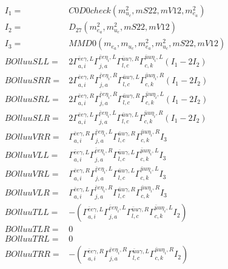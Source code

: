 \documentclass[A4,landscape]{article}
\begin{document}
\begin{align} 
I_1 = & C0D0check(m^2_{u_{{c}}}, mS22, mV12, m^2_{e_{{a}}}) \\ 
I_2 = & D_{27}(m^2_{e_{{a}}}, m^2_{u_{{c}}}, mS22, mV12) \\ 
I_3 = & MMD0(m_{e_{{a}}}, m_{u_{{c}}}, m^2_{e_{{a}}}, m^2_{u_{{c}}}, mS22, mV12) \\ 
  BOlluuSLL= & 2  \Gamma^{\bar{e}e \gamma ,L}_{a, i} \Gamma^{\bar{e}e \eta_i ,L}_{j, a} \Gamma^{\bar{u}u \gamma ,R}_{l, c} \Gamma^{\bar{u}u \eta_i ,L}_{c, k} (I_1 - 2 I_2) \\ 
  BOlluuSRR= & 2  \Gamma^{\bar{e}e \gamma ,R}_{a, i} \Gamma^{\bar{e}e \eta_i ,R}_{j, a} \Gamma^{\bar{u}u \gamma ,L}_{l, c} \Gamma^{\bar{u}u \eta_i ,R}_{c, k} (I_1 - 2 I_2) \\ 
  BOlluuSRL= & 2  \Gamma^{\bar{e}e \gamma ,R}_{a, i} \Gamma^{\bar{e}e \eta_i ,R}_{j, a} \Gamma^{\bar{u}u \gamma ,R}_{l, c} \Gamma^{\bar{u}u \eta_i ,L}_{c, k} (I_1 - 2 I_2) \\ 
  BOlluuSLR= & 2  \Gamma^{\bar{e}e \gamma ,L}_{a, i} \Gamma^{\bar{e}e \eta_i ,L}_{j, a} \Gamma^{\bar{u}u \gamma ,L}_{l, c} \Gamma^{\bar{u}u \eta_i ,R}_{c, k} (I_1 - 2 I_2) \\ 
  BOlluuVRR= &  \Gamma^{\bar{e}e \gamma ,R}_{a, i} \Gamma^{\bar{e}e \eta_i ,L}_{j, a} \Gamma^{\bar{u}u \gamma ,R}_{l, c} \Gamma^{\bar{u}u \eta_i ,R}_{c, k} I_3 \\ 
  BOlluuVLL= &  \Gamma^{\bar{e}e \gamma ,L}_{a, i} \Gamma^{\bar{e}e \eta_i ,R}_{j, a} \Gamma^{\bar{u}u \gamma ,L}_{l, c} \Gamma^{\bar{u}u \eta_i ,L}_{c, k} I_3 \\ 
  BOlluuVRL= &  \Gamma^{\bar{e}e \gamma ,R}_{a, i} \Gamma^{\bar{e}e \eta_i ,L}_{j, a} \Gamma^{\bar{u}u \gamma ,L}_{l, c} \Gamma^{\bar{u}u \eta_i ,L}_{c, k} I_3 \\ 
  BOlluuVLR= &  \Gamma^{\bar{e}e \gamma ,L}_{a, i} \Gamma^{\bar{e}e \eta_i ,R}_{j, a} \Gamma^{\bar{u}u \gamma ,R}_{l, c} \Gamma^{\bar{u}u \eta_i ,R}_{c, k} I_3 \\ 
  BOlluuTLL= & -( \Gamma^{\bar{e}e \gamma ,L}_{a, i} \Gamma^{\bar{e}e \eta_i ,L}_{j, a} \Gamma^{\bar{u}u \gamma ,R}_{l, c} \Gamma^{\bar{u}u \eta_i ,L}_{c, k} I_2) \\ 
  BOlluuTLR= & 0 \\ 
  BOlluuTRL= & 0 \\ 
  BOlluuTRR= & -( \Gamma^{\bar{e}e \gamma ,R}_{a, i} \Gamma^{\bar{e}e \eta_i ,R}_{j, a} \Gamma^{\bar{u}u \gamma ,L}_{l, c} \Gamma^{\bar{u}u \eta_i ,R}_{c, k} I_2) \\ 
\end{align} 
\end{document}
